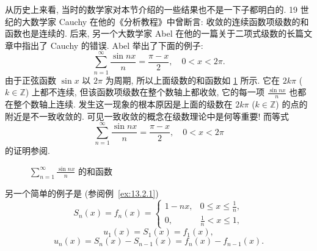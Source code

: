 
\begin{example}\label{ex:13.2.12}
从历史上来看, 当时的数学家对本节介绍的一些结果也不是一下子都明白的. 19 世纪的大数学家 Cauchy 在他的《分析教程》中曾断言: 收敛的连续函数项级数的和函数也是连续的. 后来, 另一个大数学家 Abel 在他的一篇关于二项式级数的长篇文章中指出了 Cauchy 的错误. Abel 举出了下面的例子:
\[
  \sum_{n=1}^{\infty}\frac{\sin nx}{n}=\frac{\pi-x}{2},\quad0<x<2\pi.
\]
由于正弦函数 $\sin x$ 以 $2\pi$ 为周期, 所以上面级数的和函数如 \cref{fig:13.2.4} 所示. 它在 $2k\pi$ ($k\in\mathbb{Z}$) 上都不连续, 但该函数项级数在整个数轴上都收敛, 它的每一项 $\frac{\sin nx}{n}$ 也都在整个数轴上连续. 发生这一现象的根本原因是上面的级数在 $2k\pi$ ($k\in\mathbb{Z}$) 的点的附近是不一致收敛的. 可见一致收敛的概念在级数理论中是何等重要! 而等式
\[
  \sum_{n=1}^{\infty}\frac{\sin nx}{n}=\frac{\pi-x}{2},\quad0<x<2\pi
\]
的证明参阅.
\end{example}

\begin{figure}[htbp]
  \centering
  \caption{$\sum_{n=1}^{\infty}\frac{\sin nx}{n}$ 的和函数}\label{fig:13.2.4}
\end{figure}

另一个简单的例子是 (参阅例~\ref{ex:13.2.1})
\[
  S_{n}(x)=f_{n}(x)=\begin{cases}
    1-nx, & 0\leqslant x\leqslant\frac{1}{n},\\
    0, & \frac{1}{n}<x\leqslant1,
\end{cases}
\]
\[
  u_{1}(x)=S_{1}(x)=f_{1}(x),
\]
\[
  u_{n}(x)=S_{n}(x)-S_{n-1}(x)=f_{n}(x)-f_{n-1}(x).
\]

